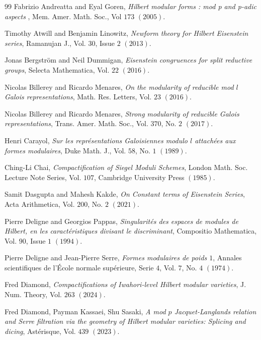\documentclass[a4paper,oneside]{amsart}
\theoremstyle{plain}
\theoremstyle{definition}
\begin{document}
\begin{thebibliography}{99}
Fabrizio Andreatta and Eyal Goren, \emph{Hilbert modular forms : mod p and p-adic aspects }, Mem. Amer. Math. Soc., Vol $173$ $(2005)$.

Timothy Atwill and Benjamin Linowitz, \emph{Newform theory for Hilbert Eisenstein series}, Ramanujan J., Vol. $30$, Issue $2$ $(2013)$.

Jonas Bergstr\"om and Neil Dummigan, \emph{Eisenstein congruences for split reductive groups}, Selecta Mathematica, Vol. $22$ $(2016)$.

Nicolas Billerey and Ricardo Menares, \emph{On the modularity of reducible mod $l$ Galois representations}, Math. Res. Letters, Vol. $23$ $(2016)$.

Nicolas Billerey and Ricardo Menares, \emph{Strong modularity of reducible Galois representations}, Trans. Amer. Math. Soc., Vol. $370$, No. $2$ $(2017)$.

Henri Carayol, \emph{Sur les repr\'esentations Galoisiennes modulo $l$ attach\'ees aux formes modulaires}, Duke Math. J., Vol. $58$, No. $1$ $(1989)$.

Ching-Li Chai, \emph{Compactification of Siegel Moduli Schemes}, London Math. Soc. Lecture Note Series, Vol. $107$, Cambridge University Press $(1985)$.

Samit Dasgupta and Mahesh Kakde,
\emph{On Constant terms of Eisenstein Series},
Acta Arithmetica, Vol. $200$, No. $2$ $(2021)$.

Pierre Deligne and Georgios Pappas, \emph{Singularit\'es des espaces de modules de Hilbert, en les caract\'eristiques divisant le discriminant}, Compositio Mathematica, Vol. $90$, Issue $1$ $(1994)$.

Pierre Deligne and Jean-Pierre Serre, \emph{Formes modulaires de poids $1$}, Annales scientifiques de l'\'Ecole
normale sup\'erieure, Serie $4$, Vol. $7$, No. $4$ $(1974)$.

Fred Diamond, \emph{Compactifications of Iwahori-level Hilbert modular varieties}, J. Num. Theory, Vol. $263$ $(2024)$.

Fred Diamond, Payman Kassaei, Shu Sasaki, \emph{A mod $p$ Jacquet-Langlands relation and Serre filtration via the geometry of Hilbert modular varieties: Splicing and dicing}, Ast\'erisque, Vol. $439$ $(2023)$.


\end{thebibliography}
\end{document}
